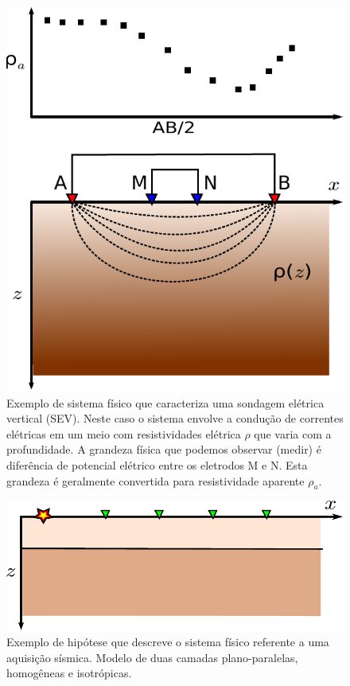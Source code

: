 \begin{figure}
    \centering
    \includegraphics[scale=0.7]{figs/system-sev}
    \caption{Exemplo de sistema físico que caracteriza uma sondagem elétrica
        vertical (SEV). Neste caso o sistema envolve a condução de correntes
        elétricas em um meio com resistividades elétrica $\rho$ que varia com
        a profundidade.
        A grandeza física que podemos observar (medir) é diferência de potencial
        elétrico entre os eletrodos M e N. Esta grandeza é geralmente convertida
        para resistividade aparente $\rho_a$.}
    \label{fig:system-sev}
\end{figure}

\begin{figure}
    \centering
    \includegraphics[scale=0.7]{figs/hipotese-seismic}
    \caption{Exemplo de hipótese que descreve o sistema físico referente a uma
    aquisição sísmica. Modelo de duas camadas plano-paralelas, homogêneas e
    isotrópicas.}
    \label{fig:hipotese-seismic}
\end{figure}

